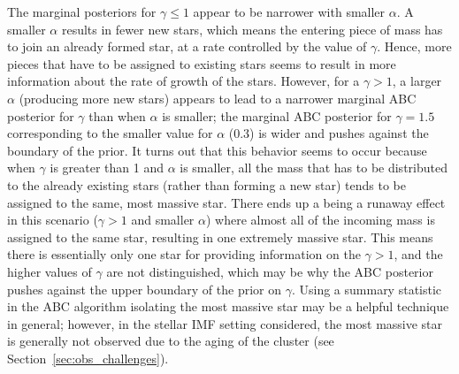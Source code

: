 \documentclass[12pt]{article}
\begin{document}
The marginal posteriors for $\gamma \leq 1$ appear to be narrower with smaller $\alpha$.  
A smaller $\alpha$ results in fewer new stars, which means the entering piece of mass has to join an already formed star, at a rate controlled by the value of $\gamma$.  Hence, more pieces that have to be assigned to existing stars seems to result in more information about the rate of growth of the stars.
%
However, for a  $\gamma > 1$, a larger $\alpha$ (producing more new stars) appears to lead to a narrower marginal ABC posterior for $\gamma$ than when $\alpha$ is smaller; the marginal ABC posterior for $\gamma = 1.5$ corresponding to the smaller value for $\alpha$ (0.3) is wider and pushes against the boundary of the prior.  
%
It turns out that this behavior seems to occur because when $\gamma$ is greater than 1 and $\alpha$ is smaller, all the mass that has to be distributed to the already existing stars (rather than forming a new star) tends to be assigned to the same, most massive star.  
%
There ends up a being a runaway effect in this scenario ($\gamma > 1$ and smaller $\alpha$) where almost all of the incoming mass is assigned to the same star, resulting in one extremely massive star.  This means there is essentially only one star for providing information on the $\gamma > 1$, and the higher values of $\gamma$ are not distinguished, which may be why the ABC posterior pushes against the upper boundary of the prior on $\gamma$.
Using a summary statistic in the ABC algorithm isolating the most massive star may be a helpful technique in general; however, in the stellar IMF setting considered, the most massive star is generally not observed due to the aging of the cluster (see Section~\ref{sec:obs_challenges}).  
\end{document}
